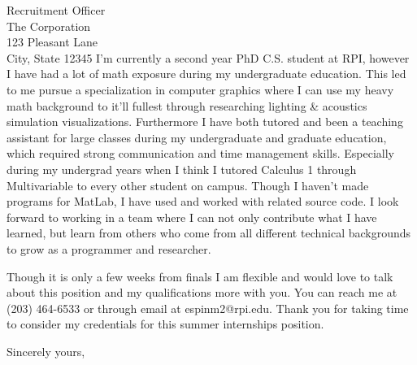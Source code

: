 \documentclass[11pt]{letter} %
\begin{document}
\begin{letter}{
Recruitment Officer \\
The Corporation \\
123 Pleasant Lane \\
City, State 12345}
%
I'm currently a second year PhD C.S. student at RPI, however I have had a lot of math exposure during my undergraduate education. 
%
This led to me pursue a specialization in computer graphics where I can use my heavy math background to it'll fullest through researching lighting \& acoustics simulation visualizations. 
%
Furthermore I have both tutored and been a teaching assistant for large classes during my undergraduate and graduate education, which required strong communication and time management skills. 
%
Especially during my undergrad years when I think I tutored Calculus 1 through Multivariable to every other student on campus. 
%
Though I haven't made programs for MatLab, I have used and worked with related source code.
%
I look forward to working in a team where I can not only contribute what I have learned, but learn from others who come from all different technical backgrounds to grow as a programmer and researcher. 
%

Though it is only a few weeks from finals I am flexible and would love to talk about this position
and my qualifications more with you. You can reach me at (203) 464-6533 or through email at espinm2@rpi.edu. Thank you for taking time to consider my credentials for this summer internships position.

\closing{Sincerely yours,}




\end{letter}
\end{document}
